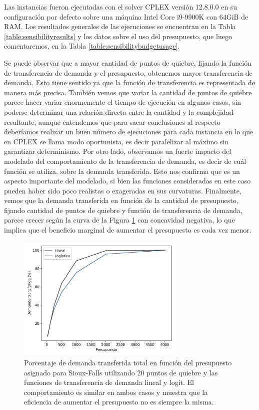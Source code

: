 \documentclass{article}
\begin{document}
  Las instancias fueron ejecutadas con el solver CPLEX versión 12.8.0.0 en su configuración por defecto sobre una máquina Intel Core i9-9900K con 64GiB de RAM. Los resultados generales de las ejecuciones se encuentran en la Tabla \ref{table:sensibilityresults} y los datos sobre el uso del presupuesto, que luego comentaremos, en la Tabla \ref{table:sensibilitybudgetusage}.

  Se puede observar que a mayor cantidad de puntos de quiebre, fijando la función de transferencia de demanda y el presupuesto, obtenemos mayor transferencia de demanda. Esto tiene sentido ya que la función de transferencia es representada de manera más precisa. También vemos que variar la cantidad de puntos de quiebre parece hacer variar enormemente el tiempo de ejecución en algunos casos, sin poderse determinar una relación directa entre la cantidad y la complejidad resultante, aunque entendemos que para sacar conclusiones al respecto deberíamos realizar un buen número de ejecuciones para cada instancia en lo que en CPLEX se llama modo oportunista, es decir paralelizar al máximo sin garantizar determinismo. Por otro lado, observamos un fuerte impacto del modelado del comportamiento de la transferencia de demanda, es decir de cuál función se utiliza, sobre la demanda transferida. Esto nos confirma que es un aspecto importante del modelado, si bien las funciones consideradas en este caso pueden haber sido poco realistas o exageradas en sus curvaturas. Finalmente, vemos que la demanda transferida en función de la cantidad de presupuesto, fijando cantidad de puntos de quiebre y función de transferencia de demanda, parece crecer según la curva de la Figura \ref{fig:demandtransferbybudgetlinear} con concavidad negativa, lo que implica que el beneficio marginal de aumentar el presupuesto es cada vez menor.

  \begin{figure}[h!]
    \centering
    \includegraphics[width=8cm]{../resources/demand_by_budget.png}
      \caption{Porcentaje de demanda transferida total en función del presupuesto asignado para Sioux-Falls utilizando 20 puntos de quiebre y las funciones de transferencia de demanda lineal y logit. El comportamiento es similar en ambos casos y muestra que la eficiencia de aumentar el presupuesto no es siempre la misma.}
    \label{fig:demandtransferbybudgetlinear}
  \end{figure}
\end{document}
